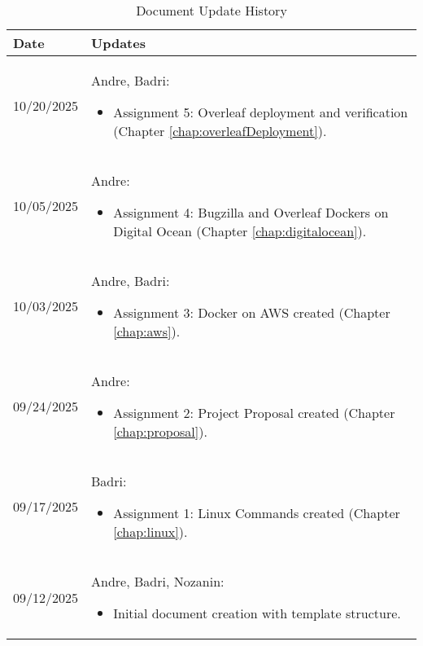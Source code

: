\begin{longtable}{|l||p{13.5cm}|}
\caption{Document Update History \label{Table::UpdateHistory}}\\
\hline
\textbf{Date} & \textbf{Updates} \\
\hline 
\endhead
10/20/2025 & Andre, Badri:
\begin{itemize}[topsep=0pt,itemsep=0pt,parsep=0pt,partopsep=0pt,leftmargin=12pt]
\item Assignment 5: Overleaf deployment and verification (Chapter \ref{chap:overleafDeployment}).
\end{itemize}
\\ \hline
10/05/2025 & Andre:
\begin{itemize}[topsep=0pt,itemsep=0pt,parsep=0pt,partopsep=0pt,leftmargin=12pt]
\item Assignment 4: Bugzilla and Overleaf Dockers on Digital Ocean (Chapter \ref{chap:digitalocean}).
\end{itemize} 
\\ \hline
10/03/2025 & Andre, Badri:
\begin{itemize}[topsep=0pt,itemsep=0pt,parsep=0pt,partopsep=0pt,leftmargin=12pt]
\item Assignment 3: Docker on AWS created (Chapter \ref{chap:aws}).
\end{itemize} 
\\ \hline
09/24/2025 & Andre:
\begin{itemize}[topsep=0pt,itemsep=0pt,parsep=0pt,partopsep=0pt,leftmargin=12pt]
\item Assignment 2: Project Proposal created (Chapter \ref{chap:proposal}).
\end{itemize} 
\\ \hline
09/17/2025 & Badri:
\begin{itemize}[topsep=0pt,itemsep=0pt,parsep=0pt,partopsep=0pt,leftmargin=12pt]
\item Assignment 1: Linux Commands created (Chapter \ref{chap:linux}).
\end{itemize} 
\\ \hline
09/12/2025 & Andre, Badri, Nozanin:
\begin{itemize}[topsep=0pt,itemsep=0pt,parsep=0pt,partopsep=0pt,leftmargin=12pt]
\item Initial document creation with template structure.
\end{itemize}
\\ \hline
\end{longtable}